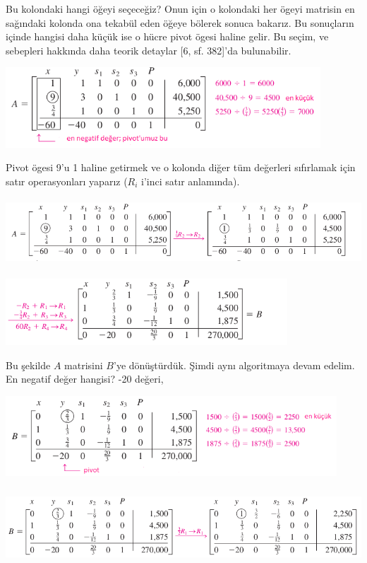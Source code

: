 \documentclass[12pt,fleqn]{article}\usepackage{../../common}
\begin{document}
Bu kolondaki hangi öğeyi seçeceğiz? Onun için o kolondaki her ögeyi matrisin en
sağındaki kolonda ona tekabül eden öğeye bölerek sonuca bakarız. Bu sonuçların
içinde hangisi daha küçük ise o hücre pivot ögesi haline gelir. Bu seçim, ve
sebepleri hakkında daha teorik detaylar [6, sf. 382]'da bulunabilir.

\includegraphics[height=3cm]{func_simplex_03.png}

Pivot ögesi 9'u 1 haline getirmek ve o kolonda diğer tüm değerleri sıfırlamak
için satır operasyonları yaparız ($R_i$ i'inci satır anlamında).

\includegraphics[height=2.5cm]{func_simplex_04.png}

\includegraphics[height=2.5cm]{func_simplex_05.png}

Bu şekilde $A$ matrisini $B$'ye dönüştürdük. Şimdi aynı algoritmaya devam
edelim. En negatif değer hangisi? -20 değeri,

\includegraphics[height=3cm]{func_simplex_06.png}

\includegraphics[height=2.8cm]{func_simplex_07.png}
\end{document}
